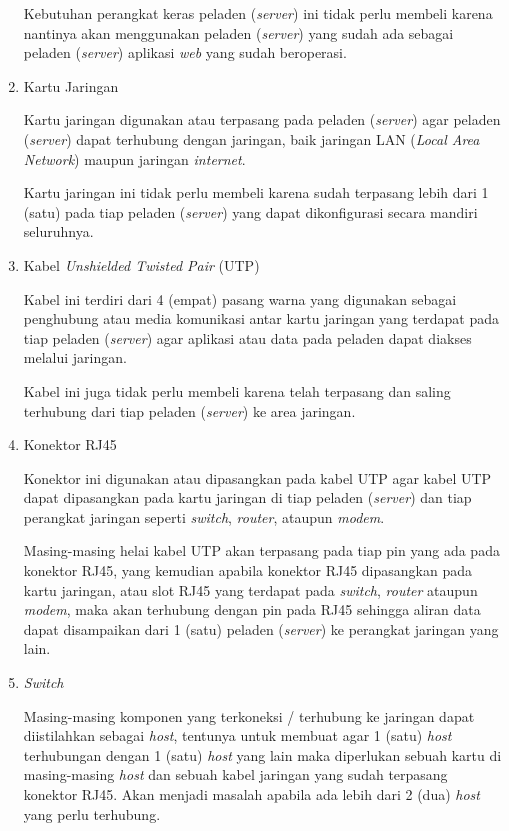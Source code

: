 \documentclass[pdftex,12pt, oneside]{article}
\begin{document}
\begin{enumerate}
\begin{enumerate}
\end{enumerate}

Kebutuhan perangkat keras peladen (\textit{server}) ini tidak perlu membeli karena nantinya akan menggunakan peladen (\textit{server}) yang sudah ada sebagai peladen (\textit{server}) aplikasi \textit{web} yang sudah beroperasi.

	\item Kartu Jaringan

Kartu jaringan digunakan atau terpasang pada peladen (\textit{server}) agar peladen (\textit{server}) dapat terhubung dengan jaringan, baik jaringan LAN (\textit{Local Area Network}) maupun jaringan \textit{internet}. 

Kartu jaringan ini tidak perlu membeli karena sudah terpasang lebih dari 1 (satu) pada tiap peladen (\textit{server}) yang dapat dikonfigurasi secara mandiri seluruhnya.

\item Kabel \textit{Unshielded Twisted Pair} (UTP)
	
Kabel ini terdiri dari 4 (empat) pasang warna yang digunakan sebagai penghubung atau media komunikasi antar kartu jaringan yang terdapat pada tiap peladen (\textit{server}) agar aplikasi atau data pada peladen dapat diakses melalui jaringan.

Kabel ini juga tidak perlu membeli karena telah terpasang dan saling terhubung dari tiap peladen (\textit{server}) ke area jaringan.	

	\item Konektor RJ45
	
	Konektor ini digunakan atau dipasangkan pada kabel UTP agar kabel UTP dapat dipasangkan pada kartu jaringan di tiap peladen (\textit{server}) dan tiap perangkat jaringan seperti \textit{switch}, \textit{router}, ataupun \textit{modem}. 
	
	Masing-masing helai kabel UTP akan terpasang pada tiap pin yang ada pada konektor RJ45, yang kemudian apabila konektor RJ45 dipasangkan pada kartu jaringan, atau slot RJ45 yang terdapat pada \textit{switch}, \textit{router} ataupun \textit{modem}, maka akan terhubung dengan pin pada RJ45 sehingga aliran data dapat disampaikan dari 1 (satu) peladen (\textit{server}) ke perangkat jaringan yang lain.	
	
	\item \textit{Switch}
	
	Masing-masing komponen yang terkoneksi / terhubung ke jaringan dapat diistilahkan sebagai \textit{host}, tentunya untuk membuat agar 1 (satu) \textit{host} terhubungan dengan 1 (satu) \textit{host} yang lain maka diperlukan sebuah kartu di masing-masing \textit{host} dan sebuah kabel jaringan yang sudah terpasang konektor RJ45. Akan menjadi masalah apabila ada lebih dari 2 (dua) \textit{host} yang perlu terhubung.


\end{enumerate}
\end{document}
